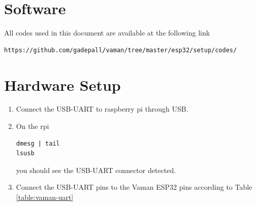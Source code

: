 \documentclass[journal,12pt,twocolumn]{IEEEtran}
\renewcommand\thesection{\arabic{section}}
\begin{document}
\section{Software}
%
All codes used in this document are available at the following link
\begin{lstlisting}
https://github.com/gadepall/vaman/tree/master/esp32/setup/codes/
\end{lstlisting}


\section{Hardware Setup}
\renewcommand{\theequation}{\theenumi}
\renewcommand{\thefigure}{\theenumi}
\begin{enumerate}[label=\thesection.\arabic*.,ref=\thesection.\theenumi]

\item Connect the USB-UART to raspberry pi through USB.  
\item On the rpi
\begin{lstlisting}
dmesg | tail
lsusb
\end{lstlisting}
you should see the USB-UART connector detected. 
\item Connect the USB-UART pins to the Vaman ESP32 pins according to Table 
		\ref{table:vaman-uart}
	\begin{table}[!h]
		
		\caption{}
		\label{table:vaman-uart}
	\end{table}


\end{enumerate}
\end{document}
